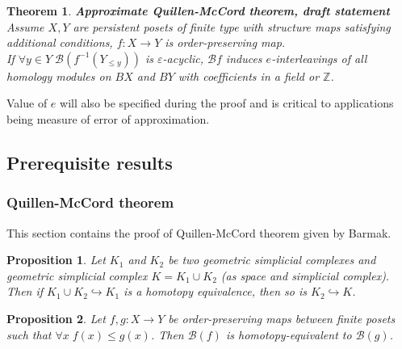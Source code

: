\documentclass[a4paper, 12pt]{article}
\newtheorem{proposition}{Proposition}
\newtheorem{theorem}{Theorem}
\theoremstyle{definition}
\theoremstyle{remark}
\newenvironment{pf}{\noindent\textbf{Proof.} ~ \par}{\qed}
\renewcommand{\leq}{\leqslant}
\begin{document}
\begin{theorem} \textbf{Approximate Quillen-McCord theorem, draft statement}\\
  Assume $X, Y$ are persistent posets of finite type with structure maps satisfying additional conditions, $f : X \to Y$ is order-preserving map.\\
  If $\forall y \in Y\;\mathcal{B}(f^{-1}(Y_{\leqslant y}))$ is $\varepsilon$-acyclic, $\mathcal{B}f$ induces $e$-interleavings of all homology modules on $BX$ and $BY$ with coefficients in a field or $\mathbb{Z}$.\\
\end{theorem}

Value of $e$ will also be specified during the proof and is critical to applications being measure of error of approximation.

\subsection{Prerequisite results}

\subsubsection{Quillen-McCord theorem}

This section contains the proof of Quillen-McCord theorem given by Barmak.

\begin{proposition} {\cite[Proposition 2.1]{Bar11}}
  Let $K_1$ and $K_2$ be two geometric simplicial complexes and geometric simplicial complex $K = K_1 \cup K_2$ (as space and simplicial complex). Then if $K_1 \cup K_2 \hookrightarrow K_1$ is a homotopy equivalence, then so is $K_2 \hookrightarrow K$.
\end{proposition}

\begin{proposition} {\cite[Proposition 2.2]{Bar11}}
  Let $f,g : X \to Y$ be order-preserving maps between finite posets such that $\forall x\;f(x) \leq g(x)$. Then $\mathcal{B}(f)$ is homotopy-equivalent to $\mathcal{B}(g)$.
\end{proposition}

%
%
\end{document}
